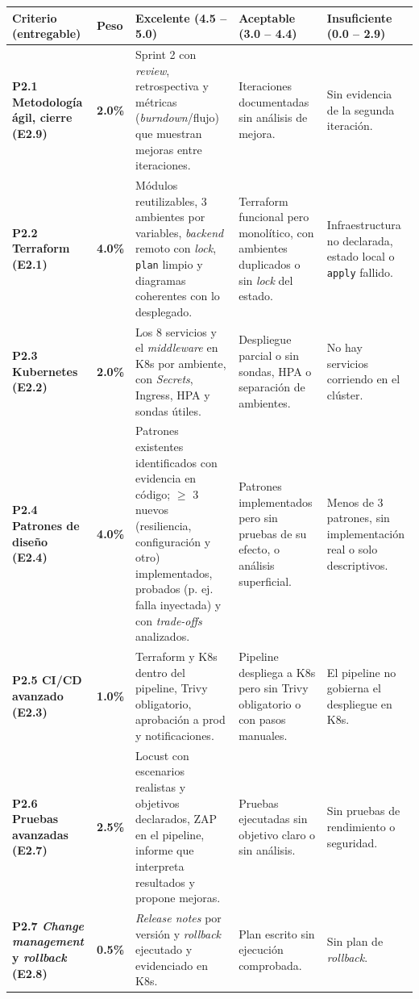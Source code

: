 \documentclass[10pt,letterpaper]{article}
\begin{document}
\fontsize{7.5}{9.5}\selectfont
\begin{longtable}{|L{2.7cm}|C{0.9cm}|L{4.35cm}|L{4.35cm}|L{4.35cm}|}
\hline
{}
\textbf{Criterio (entregable)} & \textbf{Peso} & \textbf{Excelente (4.5 -- 5.0)} & \textbf{Aceptable (3.0 -- 4.4)} & \textbf{Insuficiente (0.0 -- 2.9)} \\ \hline
\endhead
\textbf{P2.1 Metodología ágil, cierre (E2.9)} & \textbf{2.0\%} & Sprint 2 con \textit{review}, retrospectiva y métricas (\textit{burndown}/flujo) que muestran mejoras entre iteraciones. & Iteraciones documentadas sin análisis de mejora. & Sin evidencia de la segunda iteración. \\ \hline
\textbf{P2.2 Terraform (E2.1)} & \textbf{4.0\%} & Módulos reutilizables, 3 ambientes por variables, \textit{backend} remoto con \textit{lock}, \texttt{plan} limpio y diagramas coherentes con lo desplegado. & Terraform funcional pero monolítico, con ambientes duplicados o sin \textit{lock} del estado. & Infraestructura no declarada, estado local o \texttt{apply} fallido. \\ \hline
\textbf{P2.3 Kubernetes (E2.2)} & \textbf{2.0\%} & Los 8 servicios y el \textit{middleware} en K8s por ambiente, con \textit{Secrets}, Ingress, HPA y sondas útiles. & Despliegue parcial o sin sondas, HPA o separación de ambientes. & No hay servicios corriendo en el clúster. \\ \hline
\textbf{P2.4 Patrones de diseño (E2.4)} & \textbf{4.0\%} & Patrones existentes identificados con evidencia en código; $\geq$ 3 nuevos (resiliencia, configuración y otro) implementados, probados (p. ej. falla inyectada) y con \textit{trade-offs} analizados. & Patrones implementados pero sin pruebas de su efecto, o análisis superficial. & Menos de 3 patrones, sin implementación real o solo descriptivos. \\ \hline
\textbf{P2.5 CI/CD avanzado (E2.3)} & \textbf{1.0\%} & Terraform y K8s dentro del pipeline, Trivy obligatorio, aprobación a prod y notificaciones. & Pipeline despliega a K8s pero sin Trivy obligatorio o con pasos manuales. & El pipeline no gobierna el despliegue en K8s. \\ \hline
\textbf{P2.6 Pruebas avanzadas (E2.7)} & \textbf{2.5\%} & Locust con escenarios realistas y objetivos declarados, ZAP en el pipeline, informe que interpreta resultados y propone mejoras. & Pruebas ejecutadas sin objetivo claro o sin análisis. & Sin pruebas de rendimiento o seguridad. \\ \hline
\textbf{P2.7 \textit{Change management} y \textit{rollback} (E2.8)} & \textbf{0.5\%} & \textit{Release notes} por versión y \textit{rollback} ejecutado y evidenciado en K8s. & Plan escrito sin ejecución comprobada. & Sin plan de \textit{rollback}. \\ \hline

\end{longtable}
\end{document}
